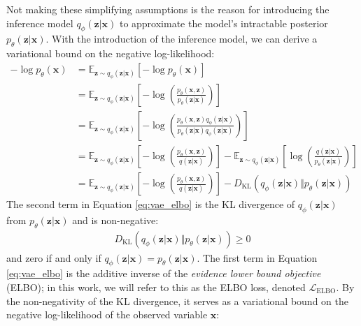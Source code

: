 \documentclass[ oneside,%
                    author={George Herbert},
                    degree={MSci},
                     title={Diffusion Models for Time-Evolving Precipitation Fields},
                  subtitle={}]{dissertation}
\begin{document}
Not making these simplifying assumptions is the reason for introducing the inference model $q_\phi(\mathbf{z}|\mathbf{x})$ to approximate the model's intractable posterior $p_\theta(\mathbf{z}|\mathbf{x})$. With the introduction of the inference model, we can derive a variational bound on the negative log-likelihood:
\begin{align}
      -\log p_\theta(\mathbf{x})&=\mathbb{E}_{\mathbf{z}\sim q_\phi(\mathbf{z}|\mathbf{x})}\left[-\log p_\theta(\mathbf{x})\right]\\
      &=\mathbb{E}_{\mathbf{z}\sim q_\phi(\mathbf{z}|\mathbf{x})}\left[-\log\left(\frac{p_\theta(\mathbf{x},\mathbf{z})}{p_\theta(\mathbf{z}|\mathbf{x})}\right)\right]\\
      &=\mathbb{E}_{\mathbf{z}\sim q_\phi(\mathbf{z}|\mathbf{x})}\left[-\log\left(\frac{p_\theta(\mathbf{x},\mathbf{z})q_\phi(\mathbf{z}|\mathbf{x})}{p_\theta(\mathbf{z}|\mathbf{x})q_\phi(\mathbf{z}|\mathbf{x})}\right)\right]\\
      &=\mathbb{E}_{\mathbf{z}\sim q_\phi(\mathbf{z}|\mathbf{x})}\left[-\log\left(\frac{p_\theta(\mathbf{x},\mathbf{z})}{q(\mathbf{z}|\mathbf{x})}\right)\right]-\mathbb{E}_{\mathbf{z}\sim q_\phi(\mathbf{z}|\mathbf{x})}\left[\log\left(\frac{q(\mathbf{z}|\mathbf{x})}{p_\theta(\mathbf{z}|\mathbf{x})}\right)\right]\\
      &=\mathbb{E}_{\mathbf{z}\sim q_\phi(\mathbf{z}|\mathbf{x})}\left[-\log\left(\frac{p_\theta(\mathbf{x},\mathbf{z})}{q(\mathbf{z}|\mathbf{x})}\right)\right]-D_{\mathrm{KL}}(q_\phi(\mathbf{z}|\mathbf{x})\Vert p_\theta(\mathbf{z}|\mathbf{x}))
      \label{eq:vae_elbo}
\end{align}
The second term in Equation \ref{eq:vae_elbo} is the KL divergence of $q_\phi(\mathbf{z}|\mathbf{x})$ from $p_\theta(\mathbf{z}|\mathbf{x})$ and is non-negative:
\begin{align}
      D_{\mathrm{KL}}(q_\phi(\mathbf{z}|\mathbf{x})\Vert p_\theta(\mathbf{z}|\mathbf{x}))\ge 0
\end{align}
and zero if and only if $q_\phi(\mathbf{z}|\mathbf{x})=p_\theta(\mathbf{z}|\mathbf{x})$. The first term in Equation \ref{eq:vae_elbo} is the additive inverse of the \textit{evidence lower bound objective} (ELBO); in this work, we will refer to this as the ELBO loss, denoted $\mathcal{L}_{\mathrm{ELBO}}$. By the non-negativity of the KL divergence, it serves as a variational bound on the negative log-likelihood of the observed variable $\mathbf{x}$:
\end{document}
